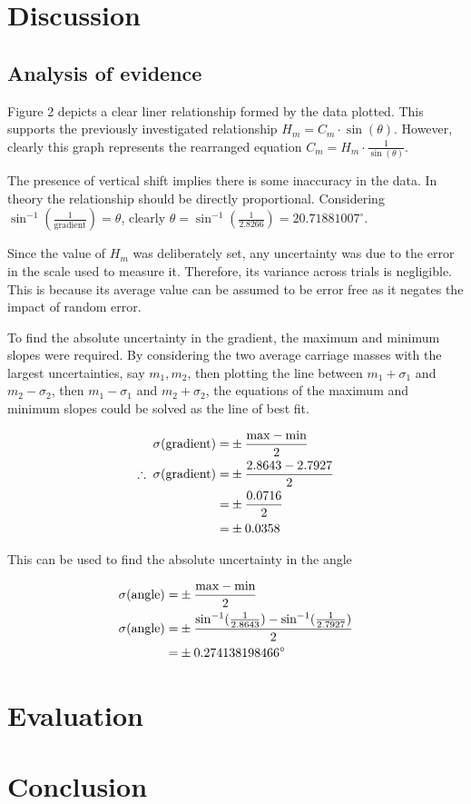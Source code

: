 \documentclass[11pt,a4paper]{article}
\begin{document}
\section{Discussion}
\subsection{Analysis of evidence}
Figure 2 depicts a clear liner relationship formed by the data plotted. This supports the previously investigated relationship  $H_m=C_m\cdot{\sin(\theta)}$. However, clearly this graph represents the rearranged equation $C_m=H_m\cdot \frac{1}{{\sin(\theta)}}$.

The presence of vertical shift implies there is some inaccuracy in the data. In theory the relationship should be directly proportional. Considering
 $\sin^{-1}\left(\frac{1}{\textrm{gradient}}\right)=\theta$, clearly $\theta = \sin^{-1}\left(\frac{1}{2.8266}\right)=20.71881007^\circ$.
 

Since the value of $H_m$ was deliberately set, any uncertainty was due to the error in the scale used to measure it. Therefore, its variance across trials is negligible. This is because its average value can be assumed to be error free as it negates the impact of random error.

To find the absolute uncertainty in the gradient, the maximum and minimum slopes were required. By considering the two average carriage masses with the largest uncertainties, say $m_1, m_2$, then plotting the line between $m_1+\sigma_1$ and $m_2-\sigma_2$, then  $m_1-\sigma_1$ and $m_2+\sigma_2$, the equations of the maximum and minimum slopes could be solved as the line of best fit.


\begin{align*}
	\centering
	\sigma(\textrm{gradient})=&\pm\frac{\textrm{max}-\textrm{min}}{2}\\
	\therefore\;\sigma(\textrm{gradient})=&\pm\frac{2.8643-2.7927}{2}\\
	=&\pm\frac{0.0716}{2}\\
	=&\pm0.0358
\end{align*}

This can be used to find the absolute uncertainty in the angle

\begin{align*}
	\centering
	\sigma(\textrm{angle})=&\pm\frac{\textrm{max}-\textrm{min}}{2}\\
	\sigma(\textrm{angle})=&\pm\frac{\sin^{-1}(\frac{1}{2.8643})-\sin^{-1}(\frac{1}{2.7927})}{2}\\
	=&\pm0.274138198466^\circ 
	\end{align*}

\section{Evaluation}


\section{Conclusion}
\newpage



	
\end{document}
